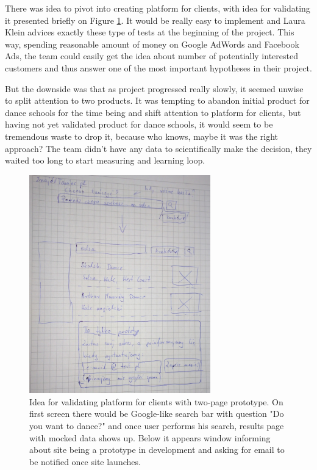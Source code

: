 \documentclass{article}
\begin{document}
There was idea to pivot into creating platform for clients, with idea for validating it presented briefly on Figure \ref{fig:znajdz-taniec}. It would be really easy to implement and Laura Klein \cite{klein2013ux} advices exactly these type of tests at the beginning of the project. This way, spending reasonable amount of money on Google AdWords and Facebook Ads, the team could easily get the idea about number of potentially interested customers and thus answer one of the most important hypotheses in their project.

But the downside was that as project progressed really slowly, it seemed unwise to split attention to two products. It was tempting to abandon initial product for dance schools for the time being and shift attention to platform for clients, but having not yet validated product for dance schools, it would seem to be tremendous waste to drop it, because who knows, maybe it was the right approach? The team didn't have any data to scientifically make the decision, they waited too long to start measuring and learning loop.

\begin{figure}[h]
    \centering
    \includegraphics[width=0.7\textwidth]{znajdz-taniec}
    \caption{Idea for validating platform for clients with two-page prototype. On first screen there would be Google-like search bar with question "Do you want to dance?" and once user performs his search, results page with mocked data shows up. Below it appears window informing about site being a prototype in development and asking for email to be notified once site launches.}
    \label{fig:znajdz-taniec} 
\end{figure}
\end{document}
